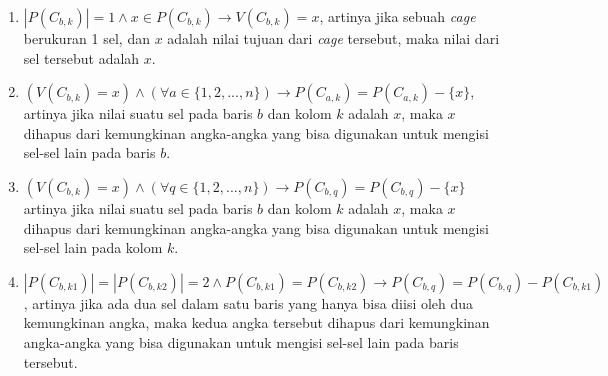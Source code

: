 \documentclass[a4paper,twoside]{article}
\begin{document}
\begin{enumerate}
\begin{enumerate}
\item \begin{math}|P(C_{b,k})| = 1 \land x \in P(C_{b,k}) \rightarrow V(C_{b,k}) = x\end{math}, artinya jika sebuah \textit{cage} berukuran 1 sel, dan \begin{math}x\end{math} adalah nilai tujuan dari \textit{cage} tersebut, maka nilai dari sel tersebut adalah \begin{math}x\end{math}.
\item \begin{math}(V(C_{b,k}) = x) \land (\forall a \in \{1, 2, ..., n\}) \rightarrow P(C_{a,k}) = P(C_{a,k}) - \{x\}\end{math}, artinya jika nilai suatu sel pada baris \begin{math}b\end{math} dan kolom \begin{math}k\end{math} adalah \begin{math}x\end{math}, maka \begin{math}x\end{math} dihapus dari kemungkinan angka-angka yang bisa digunakan untuk mengisi sel-sel lain pada baris \begin{math}b\end{math}.
\item \begin{math}(V(C_{b,k}) = x) \land (\forall q \in \{1, 2, ..., n\}) \rightarrow P(C_{b,q}) = P(C_{b,q}) - \{x\}\end{math} artinya jika nilai suatu sel pada baris \begin{math}b\end{math} dan kolom \begin{math}k\end{math} adalah \begin{math}x\end{math}, maka \begin{math}x\end{math} dihapus dari kemungkinan angka-angka yang bisa digunakan untuk mengisi sel-sel lain pada kolom \begin{math}k\end{math}.
\item \begin{math}|P(C_{b,k1})| = |P(C_{b,k2})| = 2 \land P(C_{b,k1}) = P(C_{b,k2}) \rightarrow P(C_{b,q}) = P(C_{b,q}) - P(C_{b,k1})\end{math}, artinya jika ada dua sel dalam satu baris yang hanya bisa diisi oleh dua kemungkinan angka, maka kedua angka tersebut dihapus dari kemungkinan angka-angka yang bisa digunakan untuk mengisi sel-sel lain pada baris tersebut.

\end{enumerate}
\end{enumerate}
\end{document}
